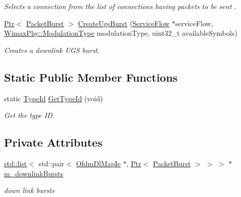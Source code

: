 \begin{DoxyCompactItemize}
\begin{DoxyCompactList}\small\item\em Selects a connection from the list of connections having packets to be sent . \end{DoxyCompactList}\item 
\hyperlink{classns3_1_1Ptr}{Ptr}$<$ \hyperlink{classns3_1_1PacketBurst}{Packet\+Burst} $>$ \hyperlink{classns3_1_1BSSchedulerSimple_a96aa7cfd2316898092c485af3b74d24c}{Create\+Ugs\+Burst} (\hyperlink{classns3_1_1ServiceFlow}{Service\+Flow} $\ast$service\+Flow, \hyperlink{classns3_1_1WimaxPhy_a044c5d8a48ca992c39c2a946f6e755fa}{Wimax\+Phy\+::\+Modulation\+Type} modulation\+Type, uint32\+\_\+t available\+Symbols)
\begin{DoxyCompactList}\small\item\em Creates a downlink U\+GS burst. \end{DoxyCompactList}\end{DoxyCompactItemize}
\subsection*{Static Public Member Functions}
\begin{DoxyCompactItemize}
\item 
static \hyperlink{classns3_1_1TypeId}{Type\+Id} \hyperlink{classns3_1_1BSSchedulerSimple_aabd5aef1efe289f580e66af0bf07ae86}{Get\+Type\+Id} (void)
\begin{DoxyCompactList}\small\item\em Get the type ID. \end{DoxyCompactList}\end{DoxyCompactItemize}
\subsection*{Private Attributes}
\begin{DoxyCompactItemize}
\item 
\hyperlink{openflow-interface_8h_afd9bcfa176617760671b67580f536fa7}{std\+::list}$<$ std\+::pair$<$ \hyperlink{classns3_1_1OfdmDlMapIe}{Ofdm\+Dl\+Map\+Ie} $\ast$, \hyperlink{classns3_1_1Ptr}{Ptr}$<$ \hyperlink{classns3_1_1PacketBurst}{Packet\+Burst} $>$ $>$ $>$ $\ast$ \hyperlink{classns3_1_1BSSchedulerSimple_a58431b0c06b4ae64220253afffdbfe06}{m\+\_\+downlink\+Bursts}
\begin{DoxyCompactList}\small\item\em down link bursts \end{DoxyCompactList}\end{DoxyCompactItemize}
